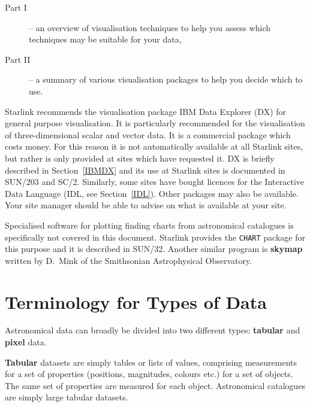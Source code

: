 \documentclass[twoside,11pt]{article}
\newcommand{\htmladdnormallink}[2]{#1}
\newcommand{\xref}[3]{#1}
\newcommand{\xlabel}[1]{}
\begin{document}
\begin{description}

  \item[{\rm Part I}] -- an overview of visualisation techniques to
    help you assess which techniques may be suitable for your data,

  \item[{\rm Part II}] -- a summary of various visualisation packages
   to help you decide which to use.

\end{description}

Starlink recommends the visualisation package IBM Data Explorer (DX) for
general purpose visualisation. It is particularly recommended for the
visualisation of three-dimensional scalar and vector data. It is a
commercial package which costs money. For this reason it is not
automatically available at all Starlink sites, but rather is only
provided at sites which have requested it. DX is briefly described in
Section~\ref{IBMDX} and its use at Starlink sites is documented in
\xref{SUN/203}{sun203}{}\cite{SUN203} and \xref{SC/2}{sc2}{}\cite{SC2}.
Similarly, some sites have bought licences for the Interactive Data
Language (IDL, see Section~\ref{IDL}). Other packages may also be
available. Your site manager should be able to advise on what is
available at your site.

Specialised software for plotting finding charts from astronomical
catalogues is specifically not covered in this document. Starlink
provides the {\tt CHART} package for this purpose and it is described
in SUN/32\cite{CHART}. Another similar program is
\htmladdnormallink{{\bf skymap}}
{http://tdc-www.harvard.edu/software/skymap.html}\cite{SKYMAP}
written by D.~Mink of the Smithsonian Astrophysical Observatory.


\section{Terminology for Types of Data \xlabel{TERMIN} }

Astronomical data can broadly be divided into two different types:
{\bf tabular} and {\bf pixel} data.

{\bf Tabular} datasets are simply tables or lists of values, comprising
measurements for a set of properties (positions, magnitudes, colours
etc.) for a set of objects. The same set of properties are measured for
each object. Astronomical catalogues are simply large tabular datasets.
\end{document}
